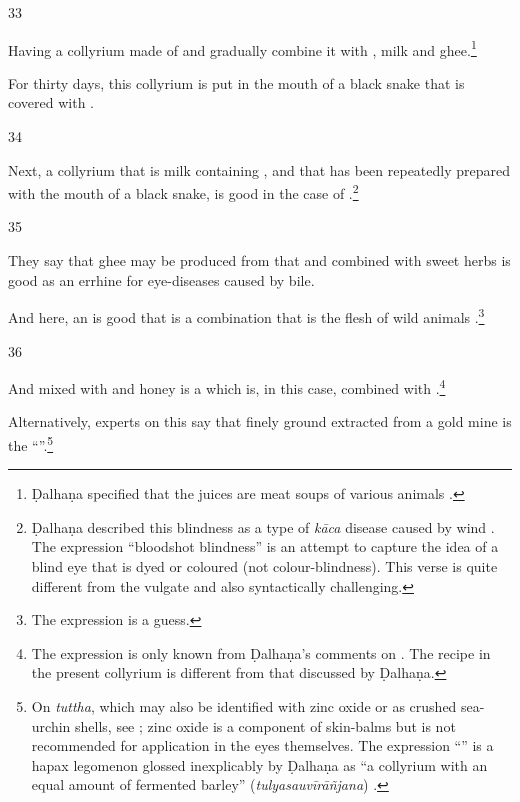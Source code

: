 \begin{translation}
    \item [33]
    
    Having 
    a collyrium made of 
    and gradually combine it with
    , milk and ghee.\footnote{Ḍalhaṇa specified that the juices are 
    meat soups of various animals \citep[628]{vulgate}.}
    
    For thirty days, this collyrium is put in the mouth of a black snake that is
    covered with .
    
    \item [34]
    
    Next, a collyrium that is milk containing ,
     and  that has been repeatedly 
    prepared
    with the mouth of a black snake, is good in the case of .\footnote{Ḍalhaṇa described this blindness as a type
    of \emph{kāca} disease caused by wind  \citep[628]{susr-trikamji3}. The expression
    “bloodshot blindness” is an attempt to capture the idea of a blind eye that is
    dyed or coloured (not colour-blindness). This verse is quite different from the
    vulgate and also syntactically challenging.}
    
    \item [35]
    
    They say that ghee may be produced from that and combined with sweet herbs is 
    good as an errhine for eye-diseases caused by bile.
    
    And here, an  is good that is a combination that is the flesh of
    wild animals .\footnote{The expression
     is a guess.  }
    
    
    \item[36]
    
    And 
     mixed with 
     and honey is a 
     which is, in this case, combined with 
    .\footnote{The expression  is
    only known from Ḍalhaṇa's comments on .  The
    recipe in the present collyrium is different from that discussed by Ḍalhaṇa.}
    
    Alternatively, experts on this say that finely ground  extracted from a gold mine is the “”.\footnote{On \emph{tuttha}, which may also be identified with zinc
oxide or as crushed sea-urchin shells, see \citet[112\,ff.]{falk-1991}; zinc
oxide is a component of skin-balms but is not recommended for application in
the eyes themselves.  The expression “” is a
hapax legomenon glossed inexplicably by Ḍalhaṇa as “a collyrium with an equal
amount of fermented barley” (\emph{tulyasauvīrāñjana}) \citep[628]{vulgate}.}
    

\end{translation}
